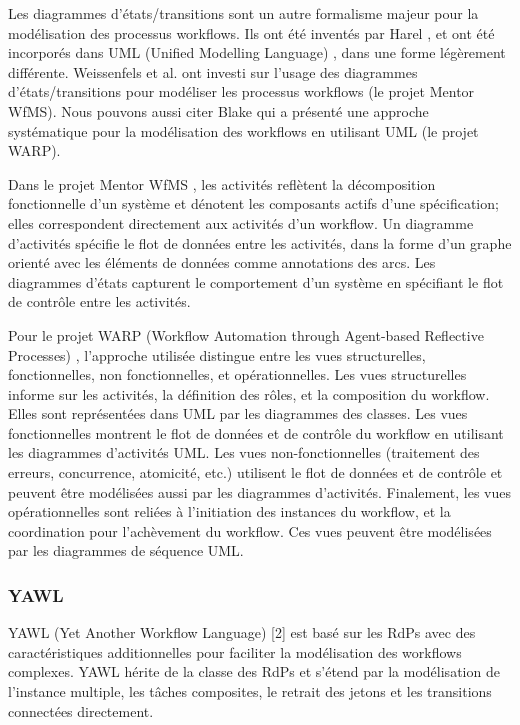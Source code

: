 Les diagrammes d'états/transitions sont un autre formalisme majeur pour la modélisation des processus workflows. Ils ont été inventés par Harel \parencite{Harel}, et ont été incorporés dans UML (Unified Modelling Language)  \parencite{UML}, dans une forme légèrement différente. Weissenfels et al. \parencite{EDBT'98} ont investi sur l'usage des diagrammes d'états/transitions pour modéliser les processus workflows (le projet Mentor WfMS). Nous pouvons aussi citer Blake \parencite{WETICE'02} qui a présenté une approche systématique pour la modélisation des workflows en utilisant UML (le projet WARP). 

Dans le projet Mentor WfMS \parencite{EDBT'98}, les activités reflètent la décomposition fonctionnelle d'un système et dénotent les composants actifs d'une spécification; elles correspondent directement aux activités d'un workflow. Un diagramme d'activités spécifie le flot de données entre les activités, dans la forme d'un graphe orienté avec les éléments de données comme annotations des arcs. Les diagrammes d'états capturent le comportement d'un système en spécifiant le flot de contrôle entre les activités.

Pour le projet WARP (Workflow Automation through Agent-based Reflective Processes) \parencite{WETICE'02}, l'approche utilisée distingue entre les vues structurelles, fonctionnelles, non fonctionnelles, et opérationnelles. Les vues structurelles informe sur les activités, la définition des rôles, et la composition du workflow. Elles sont représentées dans UML par les diagrammes des classes. Les vues fonctionnelles montrent le flot de données et de contrôle du workflow en utilisant les diagrammes d'activités UML. Les vues non-fonctionnelles (traitement des erreurs, concurrence, atomicité, etc.) utilisent le flot de données et de contrôle et peuvent être modélisées aussi par les diagrammes d'activités. Finalement, les vues opérationnelles sont reliées à l'initiation des instances du workflow, et la coordination pour l'achèvement du workflow. Ces vues peuvent être modélisées par les diagrammes de séquence UML.

\subsubsection{YAWL}
YAWL (Yet Another Workflow Language) [2] est basé sur les RdPs avec des caractéristiques additionnelles pour faciliter la modélisation des workflows complexes. YAWL hérite de la classe des RdPs et s'étend par la modélisation de l'instance multiple, les tâches composites, le retrait des jetons et les transitions connectées directement.

